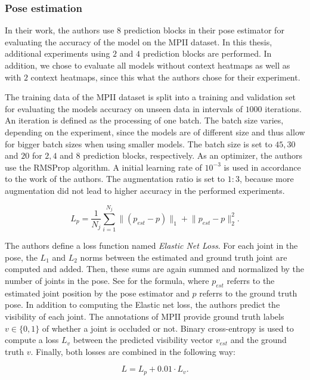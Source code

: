 \subsubsection{Pose estimation}
In their work, the authors use $8$ prediction blocks in their pose estimator for evaluating the accuracy of the model on the MPII dataset.
In this thesis, additional experiments using $2$ and $4$ prediction blocks are performed.
In addition, we chose to evaluate all models without context heatmaps as well as with $2$ context heatmaps, since this what the authors chose for their experiment.

The training data of the MPII dataset is split into a training and validation set for evaluating the models accuracy on unseen data in intervals of $1000$ iterations.
An iteration is defined as the processing of one batch.
The batch size varies, depending on the experiment, since the models are of different size and thus allow for bigger batch sizes when using smaller models.
The batch size is set to $45, 30$ and $20$ for $2, 4$ and $8$ prediction blocks, respectively.
As an optimizer, the authors use the RMSProp algorithm.
A initial learning rate of $10^{-3}$ is used in accordance to the work of the authors.
The augmentation ratio is set to $1:3$, because more augmentation did not lead to higher accuracy in the performed experiments.

\begin{equation}
    \label{eq:elasticnetloss}
    L_p = \frac{1}{N_j} \sum_{i=1}^{N_j} \lVert(p_{est} - p)\rVert_1 + \lVert p_{est} - p \rVert^2_2.
\end{equation}

The authors define a loss function named \textit{Elastic Net Loss}.
For each joint in the pose, the $L_1$ and $L_2$ norms between the estimated and ground truth joint are computed and added.
Then, these sums are again summed and normalized by the number of joints in the pose.
See  for the formula, where $p_{est}$ referrs to the estimated joint position by the pose estimator and $p$ referrs to the ground truth pose.
In addition to computing the Elastic net loss, the authors predict the visibility of each joint.
The annotations of MPII provide ground truth labels $v \in \{0,1\}$ of whether a joint is occluded or not.
Binary cross-entropy is used to compute a loss $L_v$ between the predicted visibility vector $v_{est}$ and the ground truth $v$.
Finally, both losses are combined in the following way:

\begin{equation}
    L = L_p + 0.01 \cdot L_v.
\end{equation}

